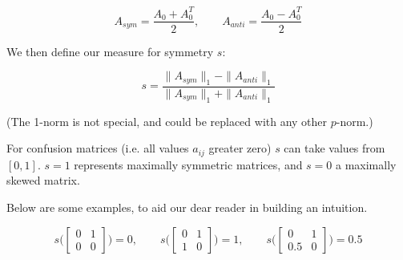 \documentclass{article}
\begin{document}
\begin{equation}
	A_{sym} = \frac{A_0 + A_0^T}{2}, \qquad
	A_{anti} = \frac{A_0 - A_0^T}{2}
\end{equation}

We then define our measure for symmetry $s$:

\begin{equation}
	s = \frac{ \|A_{sym}\|_1 - \|A_{anti}\|_1}{\|A_{sym}\|_1 + \|A_{anti}\|_1}
\end{equation}

(The 1-norm is not special, and could be replaced with any other $p$-norm.)

For confusion matrices (i.e. all values $a_{ij}$ greater zero) $s$ can take values from $[0,1]$. $s = 1$ represents maximally symmetric matrices, and $s = 0$ a maximally skewed matrix.

Below are some examples, to aid our dear reader in building an intuition.

\begin{equation*}
	s\bigg(\begin{bmatrix}
		0 & 1 \\
		0 & 0
	\end{bmatrix}\bigg) = 0, \qquad
%
	s\bigg(\begin{bmatrix}
		0 & 1 \\
		1 & 0
	\end{bmatrix}\bigg) = 1, \qquad
%
	s\bigg( \begin{bmatrix}
		0 & 1 \\
		0.5 & 0
	\end{bmatrix}\bigg) = 0.5
\end{equation*}
%
%
\end{document}
